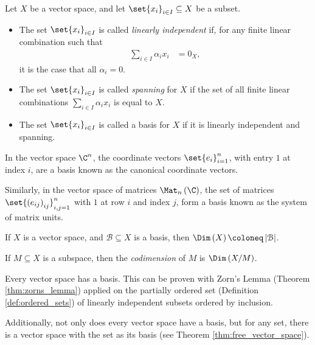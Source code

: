 \begin{definition}\label{def:basis}
  Let $X$ be a vector space, and let $\set{x_i}_{i\in I}\subseteq X$ be a subset.
  \begin{itemize}
    \item The set $\set{x_i}_{i\in I}$ is called \textit{linearly independent} if, for any finite linear combination such that
      \begin{align*}
        \sum_{i\in I}\alpha_ix_i &= 0_X,
      \end{align*}
      it is the case that all $\alpha_i = 0$.
    \item The set $\set{x_i}_{i\in I}$ is called \textit{spanning} for $X$ if the set of all finite linear combinations $\sum_{i\in I}\alpha_ix_i$ is equal to $X$.
    \item The set $\set{x_i}_{i\in I}$ is called a basis for $X$ if it is linearly independent and spanning.
  \end{itemize}
\end{definition}
\begin{example}
  In the vector space $\C^n$, the coordinate vectors $\set{e_i}_{i=1}^{n}$, with entry $1$ at index $i$, are a basis known as the canonical coordinate vectors.\newline

  Similarly, in the vector space of matrices $\Mat_n\left( \C \right)$, the set of matrices $\set{\left( e_{ij} \right)_{ij}}_{i,j=1}^{n}$ with $1$ at row $i$ and index $j$, form a basis known as the system of matrix units.
\end{example}
\begin{definition}
  If $X$ is a vector space, and $\mathcal{B}\subseteq X$ is a basis, then $\Dim\left(X\right)\coloneq \left\vert \mathcal{B} \right\vert$.\newline

  If $M\subseteq X$ is a subspace, then the \textit{codimension} of $M$ is $\Dim\left(X/M\right)$.
\end{definition}
\begin{remark}
  Every vector space has a basis. This can be proven with Zorn's Lemma (Theorem \ref{thm:zorns_lemma}) applied on the partially ordered set (Definition \ref{def:ordered_sets}) of linearly independent subsets ordered by inclusion.\newline

  Additionally, not only does every vector space have a basis, but for any set, there is a vector space with the set as its basis (see Theorem \ref{thm:free_vector_space}).
\end{remark}
